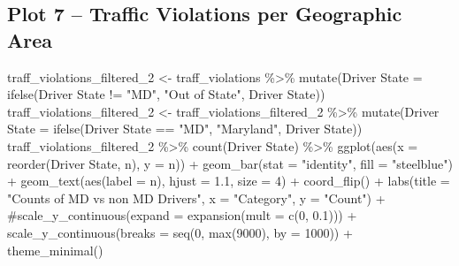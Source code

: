 \documentclass[
  letterpaper,
  DIV=11,
  numbers=noendperiod]{scrartcl}
\newenvironment{Shaded}{\begin{snugshade}}{\end{snugshade}}
\newcommand{\AttributeTok}[1]{\textcolor[rgb]{0.40,0.45,0.13}{#1}}
\newcommand{\CommentTok}[1]{\textcolor[rgb]{0.37,0.37,0.37}{#1}}
\newcommand{\DecValTok}[1]{\textcolor[rgb]{0.68,0.00,0.00}{#1}}
\newcommand{\FloatTok}[1]{\textcolor[rgb]{0.68,0.00,0.00}{#1}}
\newcommand{\FunctionTok}[1]{\textcolor[rgb]{0.28,0.35,0.67}{#1}}
\newcommand{\NormalTok}[1]{\textcolor[rgb]{0.00,0.23,0.31}{#1}}
\newcommand{\OtherTok}[1]{\textcolor[rgb]{0.00,0.23,0.31}{#1}}
\newcommand{\SpecialCharTok}[1]{\textcolor[rgb]{0.37,0.37,0.37}{#1}}
\newcommand{\StringTok}[1]{\textcolor[rgb]{0.13,0.47,0.30}{#1}}
\begin{document}
\subsection{Plot 7 -- Traffic Violations per Geographic
Area}\label{plot-7-traffic-violations-per-geographic-area}

\begin{Shaded}
\begin{Highlighting}[]
\NormalTok{traff\_violations\_filtered\_2 }\OtherTok{\textless{}{-}}\NormalTok{ traff\_violations }\SpecialCharTok{\%\textgreater{}\%}
  \FunctionTok{mutate}\NormalTok{(}\StringTok{\textasciigrave{}}\AttributeTok{Driver State}\StringTok{\textasciigrave{}} \OtherTok{=} \FunctionTok{ifelse}\NormalTok{(}\StringTok{\textasciigrave{}}\AttributeTok{Driver State}\StringTok{\textasciigrave{}} \SpecialCharTok{!=} \StringTok{"MD"}\NormalTok{, }\StringTok{"Out of State"}\NormalTok{, }\StringTok{\textasciigrave{}}\AttributeTok{Driver State}\StringTok{\textasciigrave{}}\NormalTok{))}
\NormalTok{traff\_violations\_filtered\_2 }\OtherTok{\textless{}{-}}\NormalTok{ traff\_violations\_filtered\_2 }\SpecialCharTok{\%\textgreater{}\%}
  \FunctionTok{mutate}\NormalTok{(}\StringTok{\textasciigrave{}}\AttributeTok{Driver State}\StringTok{\textasciigrave{}} \OtherTok{=} \FunctionTok{ifelse}\NormalTok{(}\StringTok{\textasciigrave{}}\AttributeTok{Driver State}\StringTok{\textasciigrave{}} \SpecialCharTok{==} \StringTok{"MD"}\NormalTok{, }\StringTok{"Maryland"}\NormalTok{, }\StringTok{\textasciigrave{}}\AttributeTok{Driver State}\StringTok{\textasciigrave{}}\NormalTok{))}
\NormalTok{traff\_violations\_filtered\_2 }\SpecialCharTok{\%\textgreater{}\%}
  \FunctionTok{count}\NormalTok{(}\StringTok{\textasciigrave{}}\AttributeTok{Driver State}\StringTok{\textasciigrave{}}\NormalTok{) }\SpecialCharTok{\%\textgreater{}\%}
  \FunctionTok{ggplot}\NormalTok{(}\FunctionTok{aes}\NormalTok{(}\AttributeTok{x =} \FunctionTok{reorder}\NormalTok{(}\StringTok{\textasciigrave{}}\AttributeTok{Driver State}\StringTok{\textasciigrave{}}\NormalTok{, n), }\AttributeTok{y =}\NormalTok{ n)) }\SpecialCharTok{+} 
  \FunctionTok{geom\_bar}\NormalTok{(}\AttributeTok{stat =} \StringTok{"identity"}\NormalTok{, }\AttributeTok{fill =} \StringTok{"steelblue"}\NormalTok{) }\SpecialCharTok{+}
  \FunctionTok{geom\_text}\NormalTok{(}\FunctionTok{aes}\NormalTok{(}\AttributeTok{label =}\NormalTok{ n), }\AttributeTok{hjust =} \FloatTok{1.1}\NormalTok{, }\AttributeTok{size =} \DecValTok{4}\NormalTok{) }\SpecialCharTok{+}
  \FunctionTok{coord\_flip}\NormalTok{() }\SpecialCharTok{+}
  \FunctionTok{labs}\NormalTok{(}\AttributeTok{title =} \StringTok{"Counts of MD vs non MD Drivers"}\NormalTok{,}
       \AttributeTok{x =} \StringTok{"Category"}\NormalTok{,}
       \AttributeTok{y =} \StringTok{"Count"}\NormalTok{) }\SpecialCharTok{+}
  \CommentTok{\#scale\_y\_continuous(expand = expansion(mult = c(0, 0.1))) +}
  \FunctionTok{scale\_y\_continuous}\NormalTok{(}\AttributeTok{breaks =} \FunctionTok{seq}\NormalTok{(}\DecValTok{0}\NormalTok{, }\FunctionTok{max}\NormalTok{(}\DecValTok{9000}\NormalTok{), }\AttributeTok{by =} \DecValTok{1000}\NormalTok{)) }\SpecialCharTok{+}
  \FunctionTok{theme\_minimal}\NormalTok{()}
\end{Highlighting}
\end{Shaded}
\end{document}
